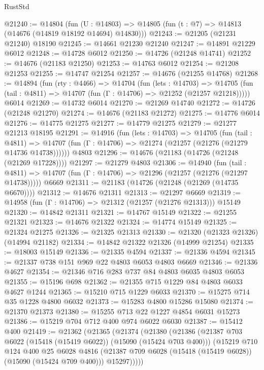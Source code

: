 \begin{lexlean}{RustStd}
\begin{coremodule}
@21240 := @14804
    (fun (U : @14803) => @14805 (fun (t : @7) => @14813 (@14676 (@14819 @18192 @14694) @14830)))
@21243 := @21205 (@21231 @21240) @18190
@21245 := @14661 @21230 @21240
@21247 := @14891 @21229 @6012
@21248 := @14728 @6012
@21250 := @14726 (@21248 @14741)
@21252 := @14676 (@21183 @21250)
@21253 := @14763 @6012
@21254 := @21208 @21253
@21255 := @14747 @21254
@21257 := @14676 (@21255 @14768)
@21268 := @14894
    (fun (rty : @4466) =>
    @14704
      (fun (lets : @14703) =>
      @14705 (fun (tail : @4811) => @14707 (fun (Γ : @14706) => @21252 (@21257 @21218)))))
    @6014
@21269 := @14732 @6014
@21270 := @21269 @14740
@21272 := @14726 (@21248 @21270)
@21274 := @14676 (@21183 @21272)
@21275 := @14776 @6014
@21276 := @14775 @21275
@21277 := @14779 @21275
@21279 := @21277 @21213 @18195
@21291 := @14916
    (fun (lets : @14703) =>
    @14705
      (fun (tail : @4811) =>
      @14707 (fun (Γ : @14706) => @21274 (@21257 (@21276 (@21279 @14736 @14738))))))
    @4803
@21296 := @14676 (@21183 (@14726 (@21248 (@21269 @17228))))
@21297 := @21279 @4803
@21306 := @14940
    (fun (tail : @4811) => @14707 (fun (Γ : @14706) => @21296 (@21257 (@21276 (@21297 @14738)))))
    @6669
@21311 := @21183 (@14726 (@21248 (@21269 (@14735 @6670))))
@21312 := @14676 @21311
@21313 := @21297 @6669
@21319 := @14958 (fun (Γ : @14706) => @21312 (@21257 (@21276 @21313))) @15149
@21320 := @14842 @21311
@21321 := @14767 @15149
@21322 := @21255 @21321
@21323 := @14676 @21322
@21324 := @14774 @15149
@21325 := @21324 @21275
@21326 := @21325 @21313
@21330 := @21320 (@21323 @21326) (@14994 @21182)
@21334 := @14842 @21322 @21326 (@14999 @21254)
@21335 := @18003 @15149
@21336 := @21335 @4594
@21337 := @21336 @4594
@21345 := @21337 @738 @151 @969 @22 @4803 @6053 @4803 @6669
@21346 := @21336 @4627
@21354 := @21346 @716 @283 @737 @84 @4803 @6035 @4803 @6053
@21355 := @15196 @698
@21362 := @21355 @715 @1229 @84 @4803 @6033 @4627 @1244
@21365 := @15210 @715 @1229 @6033
@21370 := @15275 @714 @35 @1228 @4800 @6032
@21373 := @15283 @4800 @15286 @15080
@21374 := @21370 @21373
@21380 := @15255 @713 @22 @1227 @4854 @6031 @15273
@21386 := @15219 @704 @712 @400 @974 @6022 @6030
@21387 := @15412 @400
@21419 := @21362
    (@21365
      (@21374
        (@21380
          (@21386
            (@21387 @703 @6022 (@15418 (@15419 @6022)) (@15090 (@15424 @703 @400)))
            (@15219
              @710
              @124
              @400
              @25
              @6028
              @4816
              (@21387 @709 @6028 (@15418 (@15419 @6028)) (@15090 (@15424 @709 @400)))
              @15297)))))

\end{coremodule}
\end{lexlean}
